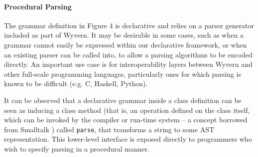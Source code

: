 \paragraph{Procedural Parsing}
The grammar definition in Figure 4 is declarative and relies on a parser generator included as part of Wyvern. It may be desirable in some cases, such as when a grammar cannot easily be expressed within our declarative framework, or when an existing parser can be called into, to allow a parsing algorithms to be encoded directly. An important use case is for interoperability layers between Wyvern and other full-scale programming languages, particularly ones for which parsing is known to be difficult (e.g. C, Haskell, Python). 

It can be observed that a declarative grammar inside a class definition can be seen as inducing a class method (that is, an operation defined on the class itself, which can be invoked by the compiler or run-time system -- a concept borrowed from Smalltalk \cite{smalltalk}) called \lstinline|parse|, that transforms a string to some AST representation. This lower-level interface is exposed directly to programmers who wish to specify parsing in a procedural manner.


%

